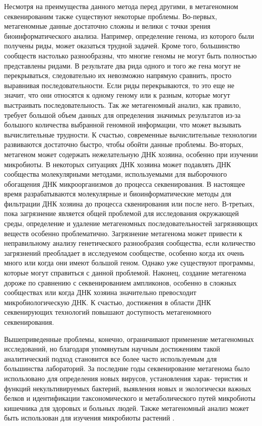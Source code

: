 Несмотря на преимущества данного метода перед другими, в метагеномном секвенированим также существуют некоторые проблемы. Во-первых, метагеномные данные достаточно
сложны и велики с точки зрения биоинформатического анализа. Например, определение генома, из которого были получены риды, может оказаться трудной задачей. Кроме того, большинство сообществ настолько разнообразны, что многие геномы не могут быть полностью
представлены ридами. В результате два рида одного и того же гена могут не перекрываться,
следовательно их невозможно напрямую сравнить, просто выравнивая последовательности.
Если риды перекрываются, то это еще не значит, что они относятся к одному геному или к
разным, которые могут выстраивать последовательность. Так же метагеномный анализ, как
правило, требует большой объем данных для определения значимых результатов из-за большого количества выбранной геномной информации, что может вызывать вычислительные
трудности. К счастью, современные вычислительные технологии развиваются достаточно
быстро, чтобы обойти данные проблемы. Во-вторых, метагеном может содержать нежелательную ДНК хозяина, особенно при изучении микробиоты. В некоторых ситуациях ДНК
хозяина может подавлять ДНК сообщества молекулярными методами, используемыми для
выборочного обогащения ДНК микроорганизмов до процесса секвенирования. В настоящее
время разрабатываются молекулярные и биоинформатические методы для фильтрации ДНК
хозяина до процесса сквенирования или после него. В-третьих, пока загрязнение является
общей проблемой для исследования окружающей среды, определение и удаление метагеномных последовательностей загрязняющих веществ особенно проблематично. Загрязнение метагенома может привести к неправильному анализу генетического разнообразия сообщества,
если количество загрязнений преобладает в исследуемом сообществе, особенно когда их очень
много или когда они имеют большой геном. Однако уже существуют программы, которые
могут справиться с данной проблемой. Наконец, создание метагенома дороже по сравнению
с секвенированием ампликонов, особенно в сложных сообществах или когда ДНК хозяина
значительно превосходит микробиологическую ДНК. К счастью, достижения в области ДНК
секвенирующих технологий повышают доступность метагеномного секвенирования.

Вышеприведенные проблемы, конечно, ограничивают применение метагеномных исследований, но благодаря упомянутым научным достижениям такой аналитический подход становится все более часто используемым для большинства лабораторий. За последние годы секвенирование метагенома было использовано для определения новых вирусов, установления харак-
теристик и функций некультивируемых бактерий, выявления новых и экологически важных
белков и идентификации таксономического и метаболического путей микробиоты кишечника
для здоровых и больных людей. Также метагеномный анализ может быть использован для
изучения микробиоты растений \cite{Sharpton2014}.

